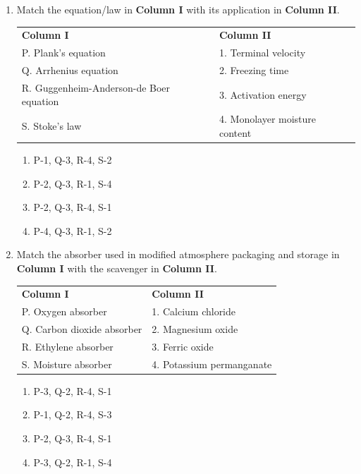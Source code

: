 \documentclass[journal,12pt,onecolumn]{IEEEtran}
\begin{document}
\begin{enumerate}[label=\arabic*.,resume]
\item Match the equation/law in \textbf{Column I} with its application in \textbf{Column II}.
\begin{table}[H]
\centering
\begin{tabular}{ll}
\textbf{Column I} & \textbf{Column II} \\
P. Plank's equation & 1. Terminal velocity \\
Q. Arrhenius equation & 2. Freezing time \\
R. Guggenheim-Anderson-de Boer equation & 3. Activation energy \\
S. Stoke's law & 4. Monolayer moisture content \\
\end{tabular}
\end{table}

\begin{multicols}{2}
\begin{enumerate}[label=(\Alph*)]
\item P-1, Q-3, R-4, S-2
\item P-2, Q-3, R-1, S-4
\item P-2, Q-3, R-4, S-1
\item P-4, Q-3, R-1, S-2
\end{enumerate}
\end{multicols}

\item Match the absorber used in modified atmosphere packaging and storage in \textbf{Column I} with the scavenger in \textbf{Column II}.
\begin{table}[H]
\centering
\begin{tabular}{ll}
\textbf{Column I} & \textbf{Column II} \\
P. Oxygen absorber & 1. Calcium chloride \\
Q. Carbon dioxide absorber & 2. Magnesium oxide \\
R. Ethylene absorber & 3. Ferric oxide \\
S. Moisture absorber & 4. Potassium permanganate \\
\end{tabular}
\end{table}

\begin{multicols}{2}
\begin{enumerate}[label=(\Alph*)]
\item P-3, Q-2, R-4, S-1
\item P-1, Q-2, R-4, S-3
\item P-2, Q-3, R-4, S-1
\item P-3, Q-2, R-1, S-4
\end{enumerate}
\end{multicols}


\end{enumerate}
\end{document}
